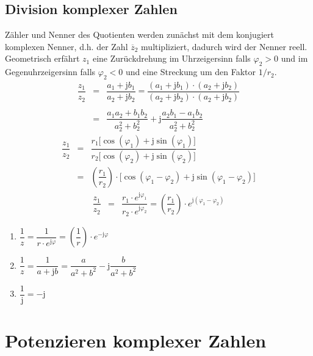 \subsection{Division komplexer Zahlen}
Zähler und Nenner des Quotienten  werden zunächst mit dem konjugiert komplexen Nenner, d.h. der Zahl $\overline{z}_2$ multipliziert, dadurch wird der Nenner reell. Geometrisch erfährt $z_1$ eine Zurückdrehung im Uhrzeigersinn falls $\varphi_2>0$ und im Gegenuhrzeigersinn falls $\varphi_2<0$ und eine Streckung um den Faktor $1/r_2$.
\begin{equation}
\boxed{
\begin{array}{lll}
\dfrac{z_1}{z_2}&=&\dfrac{a_1+\text{j}b_1}{a_2+\text{j}b_2}=\dfrac{\left(a_1+\text{j}b_1\right)\cdot \left(a_2+\text{j}b_2\right)}{\left(a_2+\text{j}b_2\right)\cdot \left(a_2+\text{j}b_2\right)}\\\\
&=&\dfrac{a_1a_2+b_1b_2}{a_2^2+b_2^2}+\text{j}\dfrac{a_2b_1-a_1b_2}{a_2^2+b_2^2}
\end{array}
}
\end{equation}
\begin{equation}
\boxed{
\begin{array}{lll}
\dfrac{z_1}{z_2}&=&\dfrac{r_1\Big[\cos\left(\varphi_1\right)+\text{j}\sin\left(\varphi_1\right)\Big]}{r_2\Big[\cos\left(\varphi_2\right)+\text{j}\sin\left(\varphi_2\right)\Big]}\\
&=&\left(\dfrac{r_1}{r_2}\right)\cdot \Big[\cos\left(\varphi_1-\varphi_2\right)+\text{j}\sin\left(\varphi_1-\varphi_2\right)\Big]
\end{array}
}
\end{equation}
\begin{equation}
\boxed{\begin{array}{lll}
\dfrac{z_1}{z_2}&=&\dfrac{r_1\cdot e^{\text{j}\varphi_1}}{r_2\cdot e^{\text{j}\varphi_2}}=\left(\dfrac{r_1}{r_2}\right)\cdot e^{\text{j}\left(\varphi_1-\varphi_2\right)}\end{array}}
\end{equation}
\begin{enumerate}[$(i)$]
\item $\dfrac{1}{z}=\dfrac{1}{r\cdot e^{\text{j}\varphi}}=\left(\dfrac{1}{r}\right)\cdot e^{-\text{j}\varphi}$
\item $\dfrac{1}{z}=\dfrac{1}{a+\text{j}b}=\dfrac{a}{a^2+b^2}-\text{j}\dfrac{b}{a^2+b^2}$
\item $\dfrac{1}{\text{j}}=-\text{j}$
\end{enumerate}
\section{Potenzieren komplexer Zahlen}
